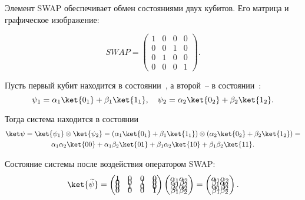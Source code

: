 \documentclass[pscyr,notitlepage]{hedwork}
\renewcommand{\~}[1]{\widetilde{#1}}
\newcommand{\lb}{\left(}
\newcommand{\rb}{\right)}
\begin{document}
  Элемент SWAP обеспечивает обмен состояниями двух кубитов. Его матрица и
  графическое изображение:
    
  \begin{minipage}{.4\textwidth}
    \center
  \end{minipage}
  \begin{minipage}{.45\textwidth}
    \[
      SW\!AP =
      \begin{pmatrix}
        1 & 0 & 0 & 0 \\[-1.7ex]
        0 & 0 & 1 & 0 \\[-1.7ex]
        0 & 1 & 0 & 0 \\[-1.7ex]
        0 & 0 & 0 & 1
      \end{pmatrix}.
    \]
  \end{minipage}
  
  
  Пусть первый кубит находится в состоянии~, а второй~-- в
  состоянии~:
  \[
    \psi_1 = \alpha_1\ket{0_1} + \beta_1\ket{1_1}, \quad
      \psi_2 = \alpha_2\ket{0_2} + \beta_2\ket{1_2}.
  \]
  
  Тогда система находится в состоянии
  \begin{gather*}
    \ket\psi = \ket{\psi_1} \otimes \ket{\psi_2} =
      \lb\alpha_1\ket{0_1} + \beta_1\ket{1_1}\rb \otimes
      \lb\alpha_2\ket{0_2} + \beta_2\ket{1_2}\rb = \\
    \alpha_1\alpha_2\ket{00} + \alpha_1\beta_2\ket{01} +
      \beta_1\alpha_2\ket{10} + \beta_1\beta_2\ket{11}. 
  \end{gather*}
  
  Состояние системы после воздействия оператором SWAP:
  \[
    \ket{\~\psi} = 
    \begin{pmatrix}
      1 & 0 & 0 & 0 \\[-1.7ex]
      0 & 0 & 1 & 0 \\[-1.7ex]
      0 & 1 & 0 & 0 \\[-1.7ex]
      0 & 0 & 0 & 1
    \end{pmatrix}
    \begin{pmatrix}
      \alpha_1\alpha_2 \\[-1.7ex] \alpha_1\beta_2 \\[-1.7ex]
      \beta_1\alpha_2 \\[-1.7ex] \beta_1\beta_2
    \end{pmatrix} =
    \begin{pmatrix}
      \alpha_1\alpha_2 \\[-1.7ex] \beta_1\alpha_2 \\[-1.7ex]
      \alpha_1\beta_2 \\[-1.7ex] \beta_1\beta_2
    \end{pmatrix}.
  \]
  
\end{document}

